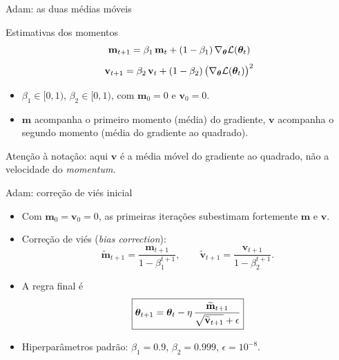 \documentclass[aspectratio=169,xcolor=dvipsnames]{beamer}
\begin{document}
  \begin{frame}{Adam: as duas médias móveis}
    \begin{block}{Estimativas dos momentos}
      \[
        \mathbf{m}_{t+1} = \beta_1\,\mathbf{m}_{t} + (1-\beta_1)\,\nabla_{\bm{\theta}}\mathcal{L}(\bm{\theta}_{t})
      \]
      \[
        \mathbf{v}_{t+1} = \beta_2\,\mathbf{v}_{t} + (1-\beta_2)\,\big(\nabla_{\bm{\theta}}\mathcal{L}(\bm{\theta}_{t})\big)^{2}
      \]
    \end{block}
    \begin{itemize}
      \item $\beta_1\in[0,1)$, $\beta_2\in[0,1)$, com $\mathbf{m}_0=0$ e $\mathbf{v}_0=0$.
      \item $\mathbf{m}$ acompanha o primeiro momento (média) do gradiente, $\mathbf{v}$ acompanha o segundo
        momento (média do gradiente ao quadrado).
    \end{itemize}
    \vspace{0.4em}
    {\footnotesize\color{gray!50!black}Atenção à notação: aqui $\mathbf{v}$ é a média móvel do gradiente ao quadrado, não a velocidade do \textit{momentum}.}
  \end{frame}

  \begin{frame}{Adam: correção de viés inicial}
    \begin{itemize}
      \item Com $\mathbf{m}_0=\mathbf{v}_0=0$, as primeiras iterações subestimam fortemente $\mathbf{m}$ e $\mathbf{v}$.
      \item Correção de viés (\textit{bias correction}):
        \[
          \widetilde{\mathbf{m}}_{t+1}=\frac{\mathbf{m}_{t+1}}{1-\beta_1^{t+1}},\qquad
          \widetilde{\mathbf{v}}_{t+1}=\frac{\mathbf{v}_{t+1}}{1-\beta_2^{t+1}}.
        \]
      \item A regra final é
        \[
          \boxed{\bm{\theta}_{t+1}=\bm{\theta}_{t}-\eta\,\frac{\widetilde{\mathbf{m}}_{t+1}}{\sqrt{\widetilde{\mathbf{v}}_{t+1}}+\epsilon}}
        \]
      \item Hiperparâmetros padrão: $\beta_1{=}0.9$, $\beta_2{=}0.999$, $\epsilon{=}10^{-8}$.
    \end{itemize}
  \end{frame}
\end{document}
